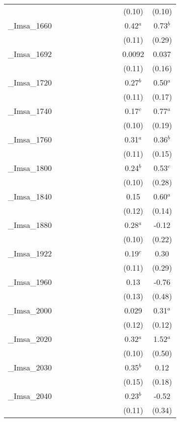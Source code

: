 \documentclass[]{article}
\begin{document}
\begin{tabular}{lcccccccccc}
 &  &  &  &  &  &  &  &  & (0.10) & (0.10) \\
\_Imsa\_1660 &  &  &  &  &  &  &  &  & 0.42$^a$ & 0.73$^b$ \\
 &  &  &  &  &  &  &  &  & (0.11) & (0.29) \\
\_Imsa\_1692 &  &  &  &  &  &  &  &  & 0.0092 & 0.037 \\
 &  &  &  &  &  &  &  &  & (0.11) & (0.16) \\
\_Imsa\_1720 &  &  &  &  &  &  &  &  & 0.27$^b$ & 0.50$^a$ \\
 &  &  &  &  &  &  &  &  & (0.11) & (0.17) \\
\_Imsa\_1740 &  &  &  &  &  &  &  &  & 0.17$^c$ & 0.77$^a$ \\
 &  &  &  &  &  &  &  &  & (0.10) & (0.19) \\
\_Imsa\_1760 &  &  &  &  &  &  &  &  & 0.31$^a$ & 0.36$^b$ \\
 &  &  &  &  &  &  &  &  & (0.11) & (0.15) \\
\_Imsa\_1800 &  &  &  &  &  &  &  &  & 0.24$^b$ & 0.53$^c$ \\
 &  &  &  &  &  &  &  &  & (0.10) & (0.28) \\
\_Imsa\_1840 &  &  &  &  &  &  &  &  & 0.15 & 0.60$^a$ \\
 &  &  &  &  &  &  &  &  & (0.12) & (0.14) \\
\_Imsa\_1880 &  &  &  &  &  &  &  &  & 0.28$^a$ & -0.12 \\
 &  &  &  &  &  &  &  &  & (0.10) & (0.22) \\
\_Imsa\_1922 &  &  &  &  &  &  &  &  & 0.19$^c$ & 0.30 \\
 &  &  &  &  &  &  &  &  & (0.11) & (0.29) \\
\_Imsa\_1960 &  &  &  &  &  &  &  &  & 0.13 & -0.76 \\
 &  &  &  &  &  &  &  &  & (0.13) & (0.48) \\
\_Imsa\_2000 &  &  &  &  &  &  &  &  & 0.029 & 0.31$^a$ \\
 &  &  &  &  &  &  &  &  & (0.12) & (0.12) \\
\_Imsa\_2020 &  &  &  &  &  &  &  &  & 0.32$^a$ & 1.52$^a$ \\
 &  &  &  &  &  &  &  &  & (0.10) & (0.50) \\
\_Imsa\_2030 &  &  &  &  &  &  &  &  & 0.35$^b$ & 0.12 \\
 &  &  &  &  &  &  &  &  & (0.15) & (0.18) \\
\_Imsa\_2040 &  &  &  &  &  &  &  &  & 0.23$^b$ & -0.52 \\
 &  &  &  &  &  &  &  &  & (0.11) & (0.34) \\

\end{tabular}
\end{document}
